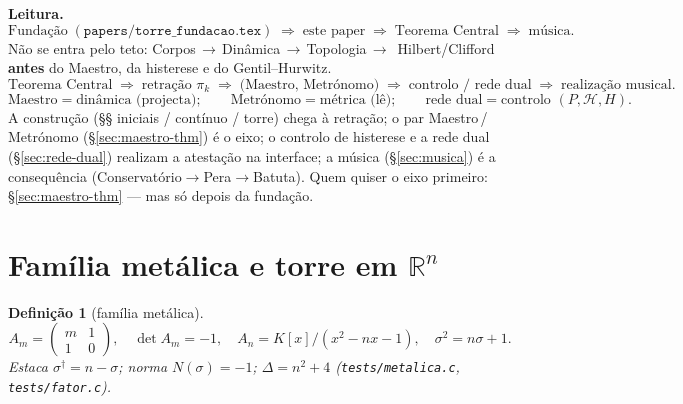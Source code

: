 \documentclass[11pt,a4paper]{article}
\newtheorem{definicao}{Definição}
\newcommand{\code}[1]{\texttt{#1}}
\begin{document}
\begin{abstract}
formaliza o par $(R,I)$, deriva Euler (\S\ref{sec:euler-peano}),
e põe o \textbf{Metrónomo entre} as visões cartesiana e polar
(\S\ref{sec:metronomo-ponte}) --- mede o tick nas duas cartas; depois
a forma polar e a releitura de Lyapunov
(\S\ref{sec:lyap-dual-releitura}). Só então a \textbf{rede neural
dual} (\S\ref{sec:rede-dual}): Teoremas~\ref{thm:retencao-neural},
\ref{thm:rede-dual}; pesos $W=-I$ pela Lei~1; Hopfield $=$ memória da
volta, não inversão --- $\lambda^{+}+\lambda^{-}=0$ pela dualidade
reversível (Teorema~\ref{thm:metronomo}). Verificação:
\code{tests/corpo\_peano.c} §CP1--§CP40;
\code{tools/bench\_histerese.sh};
\code{tools/bench\_vizinhanca.sh};
\code{papers/dualsort.tex}.
\end{abstract}

\medskip
\noindent\textbf{Leitura.}
\[
\boxed{
\text{Fundação}
\;(\code{papers/torre\_fundacao.tex})
\;\Longrightarrow\;
\text{este paper}
\;\Longrightarrow\;
\text{Teorema Central}
\;\Longrightarrow\;
\text{música}.
}
\]
Não se entra pelo teto: Corpos\,$\to$\,Dinâmica\,$\to$\,Topologia\,$\to$\,
Hilbert/Clifford \textbf{antes} do Maestro, da histerese e do Gentil--Hurwitz.
\[
\boxed{
\text{Teorema Central}
\;\Longrightarrow\;
\text{retração }\pi_k
\;\Longrightarrow\;
\bigl(\text{Maestro},\,\text{Metrónomo}\bigr)
\;\Longrightarrow\;
\text{controlo / rede dual}
\;\Longrightarrow\;
\text{realização musical}.
}
\]
\[
\boxed{
\text{Maestro}=\text{dinâmica (projecta)};
\qquad
\text{Metrónomo}=\text{métrica (lê)};
\qquad
\text{rede dual}=\text{controlo }(P,\mathcal{H},H).
}
\]
A construção (§§ iniciais / contínuo / torre) chega à retração; o
par Maestro\,/\,Metrónomo (\S\ref{sec:maestro-thm}) é o eixo; o
controlo de histerese e a rede dual (\S\ref{sec:rede-dual}) realizam
a atestação na interface; a música
(\S\ref{sec:musica}) é a consequência
(Conservatório$\to$Pera$\to$Batuta). Quem quiser o eixo primeiro:
\S\ref{sec:maestro-thm} --- mas só depois da fundação.
\section{Família metálica e torre em $\mathbb{R}^{n}$}

\begin{definicao}[família metálica]\label{def:metal}
\[
A_m=\begin{pmatrix}m&1\\1&0\end{pmatrix},
\quad\det A_m=-1,
\quad
A_n=K[x]/(x^{2}-nx-1),
\quad
\sigma^{2}=n\sigma+1.
\]
Estaca $\sigma^{\dagger}=n-\sigma$; norma $N(\sigma)=-1$;
$\Delta=n^{2}+4$ (\code{tests/metalica.c}, \code{tests/fator.c}).
\end{definicao}
\end{document}
